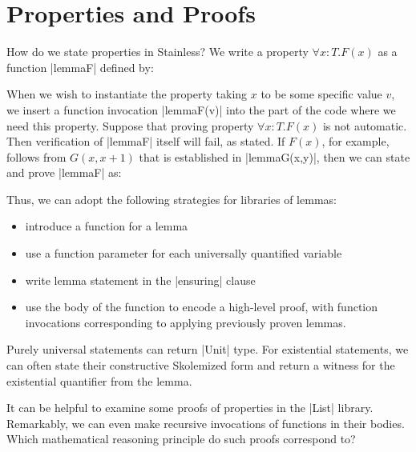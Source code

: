 \section{Properties and Proofs}

How do we state properties in Stainless? We write a property $\forall x:T. F(x)$ as a function |lemmaF| defined by:

When we wish to instantiate the property taking $x$ to be some specific value $v$, we insert a function invocation
|lemmaF(v)| into the part of the code where we need this property. Suppose that proving property $\forall x:T. F(x)$
is not automatic. Then verification of |lemmaF| itself will fail, as stated. If $F(x)$, for example, follows from
$G(x,x+1)$ that is established in |lemmaG(x,y)|, then we can state and prove |lemmaF| as:

Thus, we can adopt the following strategies for libraries of lemmas:
\begin{itemize}
\item introduce a function for a lemma
\item use a function parameter for each universally quantified variable
\item write lemma statement in the |ensuring| clause
\item use the body of the function to encode a high-level proof,
  with function invocations corresponding to applying previously proven lemmas.
\end{itemize}
Purely universal statements can return |Unit| type. For existential statements,
we can often state their constructive Skolemized form and return a witness
for the existential quantifier from the lemma.

It can be helpful to examine some proofs of properties in the |List| library.
Remarkably, we can even make recursive invocations of functions in their bodies.
Which mathematical reasoning principle do such proofs correspond to?
